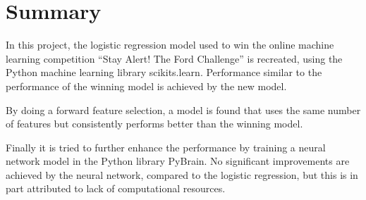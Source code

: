 \chapter*{Summary}

In this project, the logistic regression model used to win the online machine learning competition ``Stay Alert! The Ford Challenge'' is recreated, using the Python machine learning library scikits.learn. Performance similar to the performance of the winning model is achieved by the new model. \par
By doing a forward feature selection, a model is found that uses the same number of features but consistently performs better than the winning model. \par
Finally it is tried to further enhance the performance by training a neural network model in the Python library PyBrain. No significant improvements are achieved by the neural network, compared to the logistic regression, but this is in part attributed to lack of computational resources.
